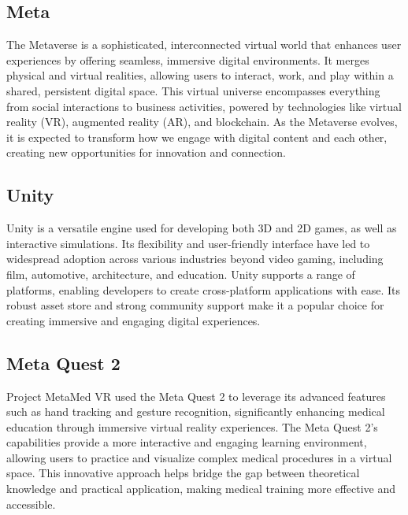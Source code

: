\subsection{Meta}
The Metaverse is a sophisticated, interconnected virtual world that enhances user experiences by offering seamless, immersive digital environments. It merges physical and virtual realities, allowing users to interact, work, and play within a shared, persistent digital space. This virtual universe encompasses everything from social interactions to business activities, powered by technologies like virtual reality (VR), augmented reality (AR), and blockchain. As the Metaverse evolves, it is expected to transform how we engage with digital content and each other, creating new opportunities for innovation and connection.
\subsection{Unity}
Unity is a versatile engine used for developing both 3D and 2D games, as well as interactive simulations. Its flexibility and user-friendly interface have led to widespread adoption across various industries beyond video gaming, including film, automotive, architecture, and education. Unity supports a range of platforms, enabling developers to create cross-platform applications with ease. Its robust asset store and strong community support make it a popular choice for creating immersive and engaging digital experiences.
\newpage
\subsection{Meta Quest 2}
Project MetaMed VR used the Meta Quest 2 to leverage its advanced features such as hand tracking and gesture recognition, significantly enhancing medical education through immersive virtual reality experiences. The Meta Quest 2's capabilities provide a more interactive and engaging learning environment, allowing users to practice and visualize complex medical procedures in a virtual space. This innovative approach helps bridge the gap between theoretical knowledge and practical application, making medical training more effective and accessible.
